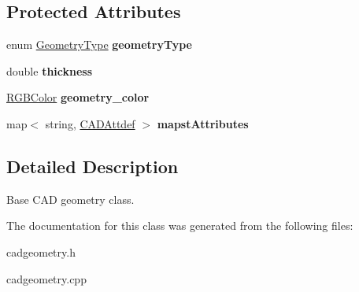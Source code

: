 \subsection*{Protected Attributes}
\begin{DoxyCompactItemize}
\item 
enum \hyperlink{class_c_a_d_geometry_a0515ed61d3514d528f78b8ba6c4fc5f3}{Geometry\+Type} {\bfseries geometry\+Type}\hypertarget{class_c_a_d_geometry_a34a284842b50d41052f7abc396ed7f91}{}\label{class_c_a_d_geometry_a34a284842b50d41052f7abc396ed7f91}

\item 
double {\bfseries thickness}\hypertarget{class_c_a_d_geometry_acbd206b728d8f720c3d0ac76ccdd0d33}{}\label{class_c_a_d_geometry_acbd206b728d8f720c3d0ac76ccdd0d33}

\item 
\hyperlink{struct_r_g_b_color}{R\+G\+B\+Color} {\bfseries geometry\+\_\+color}\hypertarget{class_c_a_d_geometry_a0d8a3754c859cc103c7ca839d14f279c}{}\label{class_c_a_d_geometry_a0d8a3754c859cc103c7ca839d14f279c}

\item 
map$<$ string, \hyperlink{class_c_a_d_attdef}{C\+A\+D\+Attdef} $>$ {\bfseries mapst\+Attributes}\hypertarget{class_c_a_d_geometry_ac19dcae705c7b896a880de525f701b51}{}\label{class_c_a_d_geometry_ac19dcae705c7b896a880de525f701b51}

\end{DoxyCompactItemize}


\subsection{Detailed Description}
Base C\+AD geometry class. 

The documentation for this class was generated from the following files\+:\begin{DoxyCompactItemize}
\item 
cadgeometry.\+h\item 
cadgeometry.\+cpp\end{DoxyCompactItemize}
